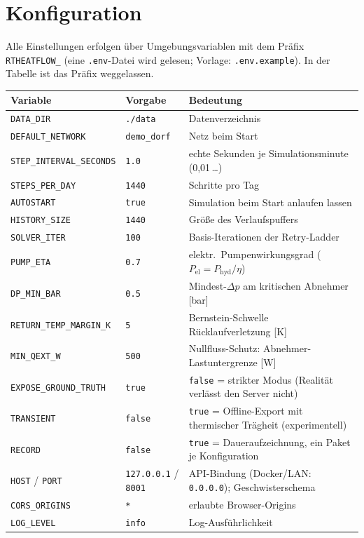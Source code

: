 \documentclass[11pt,a4paper,parskip=half]{scrreprt}
\begin{document}
\chapter{Konfiguration}
\label{ch:konfiguration}

Alle Einstellungen erfolgen über Umgebungsvariablen mit dem Präfix
\texttt{RTHEATFLOW\_} (eine \texttt{.env}-Datei wird gelesen; Vorlage:
\texttt{.env.example}). In der Tabelle ist das Präfix weggelassen.

{\small
\begin{longtable}{@{}p{}p{}p{}@{}}
\toprule
Variable & Vorgabe & Bedeutung \\
\midrule
\endhead
\texttt{DATA\_DIR}              & \texttt{./data}     & Datenverzeichnis \\
\texttt{DEFAULT\_NETWORK}       & \texttt{demo\_dorf} & Netz beim Start \\
\texttt{STEP\_INTERVAL\_SECONDS}& \texttt{1.0}        & echte Sekunden je Simulationsminute (0{,}01\,…) \\
\texttt{STEPS\_PER\_DAY}        & \texttt{1440}       & Schritte pro Tag \\
\texttt{AUTOSTART}              & \texttt{true}       & Simulation beim Start anlaufen lassen \\
\texttt{HISTORY\_SIZE}          & \texttt{1440}       & Größe des Verlaufspuffers \\
\texttt{SOLVER\_ITER}           & \texttt{100}        & Basis-Iterationen der Retry-Ladder \\
\texttt{PUMP\_ETA}              & \texttt{0.7}        & elektr.\ Pumpenwirkungsgrad ($P_\text{el}=P_\text{hyd}/\eta$) \\
\texttt{DP\_MIN\_BAR}           & \texttt{0.5}        & Mindest-$\Delta p$ am kritischen Abnehmer [bar] \\
\texttt{RETURN\_TEMP\_MARGIN\_K}& \texttt{5}          & Bernstein-Schwelle Rücklaufverletzung [K] \\
\texttt{MIN\_QEXT\_W}           & \texttt{500}        & Nullfluss-Schutz: Abnehmer-Lastuntergrenze [W] \\
\texttt{EXPOSE\_GROUND\_TRUTH}  & \texttt{true}       & \texttt{false} = strikter Modus (Realität verlässt den Server nicht) \\
\texttt{TRANSIENT}              & \texttt{false}      & \texttt{true} = Offline-Export mit thermischer Trägheit (experimentell) \\
\texttt{RECORD}                 & \texttt{false}      & \texttt{true} = Daueraufzeichnung, ein Paket je Konfiguration \\
\texttt{HOST} / \texttt{PORT}   & \texttt{127.0.0.1} / \texttt{8001} & API-Bindung (Docker/LAN: \texttt{0.0.0.0}); Geschwisterschema \\
\texttt{CORS\_ORIGINS}          & \texttt{*}          & erlaubte Browser-Origins \\
\texttt{LOG\_LEVEL}             & \texttt{info}       & Log-Ausführlichkeit \\
\bottomrule
\end{longtable}}
\end{document}
